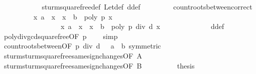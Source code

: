 \begin{isabellebody}
\ \ \ \ \ \ \ \ \ \ \isamarkupfalse%
\ sturm{\isacharunderscore}squarefree{\isacharprime}{\isacharunderscore}def\ Let{\isacharunderscore}def\ d{\isacharunderscore}def\ \isacommand{{\isachardot}}\isamarkupfalse%
\isanewline
\ \ \ \ \ \ \isamarkupfalse%
\ count{\isacharunderscore}roots{\isacharunderscore}between{\isacharunderscore}correct\isanewline
\ \ \ \ \ \ \isamarkupfalse%
\ \isamarkupfalse%
\ {\isachardoublequoteopen}{\isacharbraceleft}x{\isachardot}\ a\ {\isacharless}\ x\ {\isasymand}\ x\ {\isasymle}\ b\ {\isasymand}\ poly\ p\ x\ {\isacharequal}\ {}{\isacharbraceright}\ {\isacharequal}\ \isanewline
\ \ \ \ \ \ \ \ \ \ \ \ \ \ \ \ \ {\isacharbraceleft}x{\isachardot}\ a\ {\isacharless}\ x\ {\isasymand}\ x\ {\isasymle}\ b\ {\isasymand}\ poly\ {\isacharparenleft}p\ div\ d{\isacharparenright}\ x\ {\isacharequal}\ {}{\isacharbraceright}{\isachardoublequoteclose}\isanewline
\ \ \ \ \ \ \ \ \ \ \isamarkupfalse%
\ d{\isacharunderscore}def\ \isamarkupfalse%
\ poly{\isacharunderscore}div{\isacharunderscore}gcd{\isacharunderscore}squarefree{\isacharparenleft}{}{\isacharparenright}{\isacharbrackleft}OF\ {\isacharbackquoteopen}p\ {\isasymnoteq}\ {}{\isacharbackquoteclose}{\isacharbrackright}\ \isamarkupfalse%
\ simp\isanewline
\ \ \ \ \ \ \isamarkupfalse%
\ \isamarkupfalse%
\ count{\isacharunderscore}roots{\isacharunderscore}between{\isacharbrackleft}OF\ {\isacharbackquoteopen}p\ div\ d\ {\isasymnoteq}\ {}{\isacharbackquoteclose}\ {\isacharbackquoteopen}a\ {\isasymle}\ b{\isacharbackquoteclose}{\isacharcomma}\ symmetric{\isacharbrackright}\isanewline
\ \ \ \ \ \ \isamarkupfalse%
\ \isamarkupfalse%
\ sturm{\isacharunderscore}sturm{\isacharunderscore}squarefree{\isacharprime}{\isacharunderscore}same{\isacharunderscore}sign{\isacharunderscore}changes{\isacharparenleft}{}{\isacharparenright}{\isacharbrackleft}OF\ A{\isacharbrackright}\isanewline
\ \ \ \ \ \ \isamarkupfalse%
\ \isamarkupfalse%
\ sturm{\isacharunderscore}sturm{\isacharunderscore}squarefree{\isacharprime}{\isacharunderscore}same{\isacharunderscore}sign{\isacharunderscore}changes{\isacharparenleft}{}{\isacharparenright}{\isacharbrackleft}OF\ B{\isacharbrackright}\isanewline
\ \ \ \ \ \ \isamarkupfalse%
\ \isamarkupfalse%
\ {\isacharquery}thesis\ \isamarkupfalse%

\end{isabellebody}

